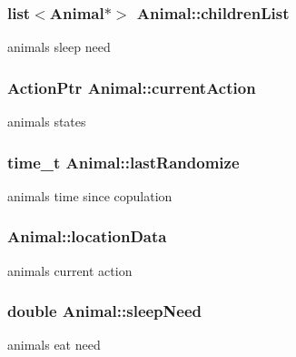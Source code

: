 \subsubsection[{children\+List}]{\setlength{\rightskip}{0pt plus 5cm}list$<${\bf Animal}$\ast$$>$ Animal\+::children\+List}\label{class_animal_a94a0b9dc3fa747aea4eaed4d615bcb32}
animal\textquotesingle{}s sleep need \hypertarget{class_animal_ab0da50ec5f81ba73009c4c658753a03d}{}
\subsubsection[{current\+Action}]{\setlength{\rightskip}{0pt plus 5cm}Action\+Ptr Animal\+::current\+Action\hspace{0.3cm}{\ttfamily [protected]}}\label{class_animal_ab0da50ec5f81ba73009c4c658753a03d}
animal\textquotesingle{}s states \hypertarget{class_animal_aed941628e1e462bb2199398db8251192}{}
\subsubsection[{last\+Randomize}]{\setlength{\rightskip}{0pt plus 5cm}time\+\_\+t Animal\+::last\+Randomize\hspace{0.3cm}{\ttfamily [protected]}}\label{class_animal_aed941628e1e462bb2199398db8251192}
animal\textquotesingle{}s time since copulation \hypertarget{class_animal_a2f521f0bb872d3ffe82e4f0d1e816abe}{}
\subsubsection[{location\+Data}]{ Animal\+::location\+Data\hspace{0.3cm}{\ttfamily [protected]}}\label{class_animal_a2f521f0bb872d3ffe82e4f0d1e816abe}
animal\textquotesingle{}s current action \hypertarget{class_animal_abfdde3c7e89db79ef04abc9312648206}{}
\subsubsection[{sleep\+Need}]{\setlength{\rightskip}{0pt plus 5cm}double Animal\+::sleep\+Need\hspace{0.3cm}{\ttfamily [protected]}}\label{class_animal_abfdde3c7e89db79ef04abc9312648206}
animal\textquotesingle{}s eat need \hypertarget{class_animal_a944296b52e238a919c56f3738bd31989}{}
